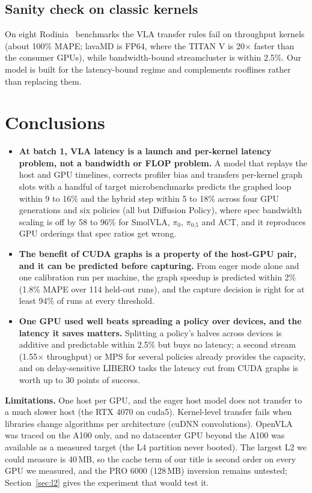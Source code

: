 \documentclass[10pt,twocolumn]{article}
\begin{document}
\subsection{Sanity check on classic kernels}
On eight Rodinia~\cite{rodinia} benchmarks the VLA transfer rules fail on throughput kernels
(about 100\% MAPE; lavaMD is FP64, where the TITAN V is 20$\times$ faster than the consumer
GPUs), while bandwidth-bound streamcluster is within 2.5\%. Our model is built for the
latency-bound regime and complements rooflines rather than replacing them.

\section{Conclusions}
\begin{itemize}
\item \textbf{At batch 1, VLA latency is a launch and per-kernel latency problem, not a
bandwidth or FLOP problem.} A model that replays the host and GPU timelines, corrects profiler
bias and transfers per-kernel graph slots with a handful of target microbenchmarks predicts the
graphed loop within 9 to 16\% and the hybrid step within 5 to 18\% across four GPU generations
and six policies (all but Diffusion Policy), where spec bandwidth scaling is off by 58 to 96\%
for SmolVLA, $\pi_0$, $\pi_{0.5}$ and ACT, and it reproduces GPU orderings that spec ratios
get wrong.
\item \textbf{The benefit of CUDA graphs is a property of the host-GPU pair, and it can be
predicted before capturing.} From eager mode alone and one calibration run per machine, the
graph speedup is predicted within 2\% (1.8\% MAPE over 114 held-out runs), and the capture
decision is right for at least 94\% of runs at every threshold.
\item \textbf{One GPU used well beats spreading a policy over devices, and the latency it
saves matters.} Splitting a policy's halves across devices is additive and predictable within
2.5\% but buys no latency; a second stream (1.55$\times$ throughput) or MPS for several
policies already provides the capacity, and on delay-sensitive LIBERO tasks the latency cut
from CUDA graphs is worth up to 30 points of success.
\end{itemize}

\textbf{Limitations.} One host per GPU, and the eager host model does not transfer to a much
slower host (the RTX 4070 on cuda5). Kernel-level transfer fails when libraries change
algorithms per architecture (cuDNN convolutions). OpenVLA was traced on the A100 only, and no
datacenter GPU beyond the A100 was available as a measured target (the L4 partition never
booted). The largest L2 we could measure is 40\,MB, so the cache term of our title is second
order on every GPU we measured, and the PRO 6000 (128\,MB) inversion remains untested;
Section~\ref{sec:l2} gives the experiment that would test it.
\end{document}
